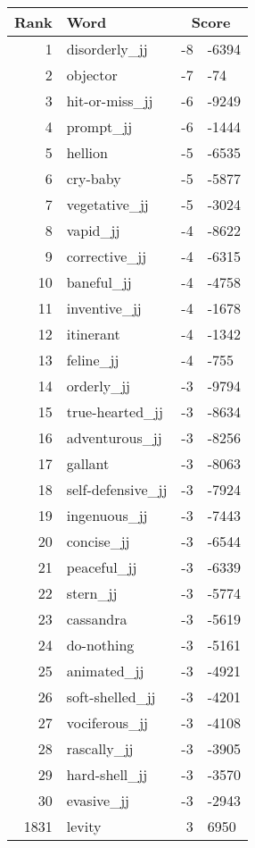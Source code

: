 \begin{longtable}[!htbp]{| rlr@{.}l |}
    \hline
    \textbf{Rank} & \textbf{Word} & \multicolumn{2}{c|}{\textbf{Score}} \\
    \hline
    \endhead
    1 & disorderly\_jj & -8 & -6394 \\
    2 & objector & -7 & -74 \\
    3 & hit-or-miss\_jj & -6 & -9249 \\
    4 & prompt\_jj & -6 & -1444 \\
    5 & hellion & -5 & -6535 \\
    6 & cry-baby & -5 & -5877 \\
    7 & vegetative\_jj & -5 & -3024 \\
    8 & vapid\_jj & -4 & -8622 \\
    9 & corrective\_jj & -4 & -6315 \\
    10 & baneful\_jj & -4 & -4758 \\
    11 & inventive\_jj & -4 & -1678 \\
    12 & itinerant & -4 & -1342 \\
    13 & feline\_jj & -4 & -755 \\
    14 & orderly\_jj & -3 & -9794 \\
    15 & true-hearted\_jj & -3 & -8634 \\
    16 & adventurous\_jj & -3 & -8256 \\
    17 & gallant & -3 & -8063 \\
    18 & self-defensive\_jj & -3 & -7924 \\
    19 & ingenuous\_jj & -3 & -7443 \\
    20 & concise\_jj & -3 & -6544 \\
    21 & peaceful\_jj & -3 & -6339 \\
    22 & stern\_jj & -3 & -5774 \\
    23 & cassandra & -3 & -5619 \\
    24 & do-nothing & -3 & -5161 \\
    25 & animated\_jj & -3 & -4921 \\
    26 & soft-shelled\_jj & -3 & -4201 \\
    27 & vociferous\_jj & -3 & -4108 \\
    28 & rascally\_jj & -3 & -3905 \\
    29 & hard-shell\_jj & -3 & -3570 \\
    30 & evasive\_jj & -3 & -2943 \\
    1831 & levity & 3 & 6950 \\

\end{longtable}
